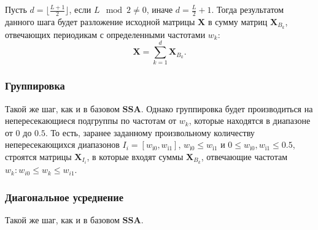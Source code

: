 \documentclass[a4paper, 11pt]{article}
\newcommand{\SSA}{\textbf{SSA}}
\begin{document}
Пусть $d = \lfloor \frac{L+1}{2} \rfloor$, если $L \mod 2 \not = 0$, иначе $d = \frac{L}{2} + 1$. Тогда результатом данного шага будет разложение исходной матрицы $\mathbf X$ в сумму матриц $\mathbf{X}_{B_k}$, отвечающих периодикам с определенными частотами $w_k$:
\begin{equation*}
	\mathbf X = \sum\limits_{k=1}^d \mathbf{X}_{B_k} .
\end{equation*}


\subsubsection{Группировка}
Такой же шаг, как и в базовом $\SSA$. Однако группировка будет производиться на непересекающиеся подгруппы по частотам от $w_k$, которые находятся в диапазоне от $0$ до $0.5$. То есть, заранее заданному произвольному количеству непересекающихся диапазонов $I_i = \left[w_{\mathrm{i0}}, w_{\mathrm{i1}}\right]$, $w_{\mathrm{i0}} \leq w_{\mathrm{i1}}$ и $0 \leq w_{\mathrm{i0}}, w_{\mathrm{i1}} \leq 0.5$, строятся матрицы $\mathbf X_{I_i}$, в которые входят суммы $\mathbf X_{B_k}$, отвечающие частотам $w_k: w_{i0} \leq w_k \leq w_{i1}$.

\subsubsection{Диагональное усреднение}
Такой же шаг, как и в базовом $\SSA$.
\end{document}
